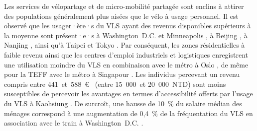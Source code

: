 \begin{refsegment}
Les services de vélopartage et de micro-mobilité partagée sont enclins à attirer des populations généralement plus aisées que le vélo à usage personnel. Il est observé que les usager·ère·s du \acrshort{VLS} ayant des revenus disponibles supérieurs à la moyenne sont présent·e·s à Washington~D.C. et Minneapolis \textcolor{blue}{\autocite[321]{martin_evaluating_2014}}, à Beijing \textcolor{blue}{\autocite[55]{zhao_bicycle-metro_2017}}, à Nanjing \textcolor{blue}{\autocite[7]{yang_empirical_2016}}, ainsi qu'à Taipei et Tokyo \textcolor{blue}{\autocite[216]{lin_built_2018}}. Par conséquent, les zones résidentielles à faible revenu ainsi que les centres d'emploi industriels et logistiques enregistrent une utilisation moindre du \acrshort{VLS} en combinaison avec le métro à Oslo \textcolor{blue}{\autocite[399]{bocker_bike_2020}}, de même pour la \acrshort{TEFF} avec le métro à Singapour \textcolor{blue}{\autocite[184]{cao_e-scooter_2021}}. Les individus percevant un revenu compris entre 441~et~588~\euro~ (entre 15~000~et 20~000~NTD) sont moins susceptibles de percevoir les avantages en termes d'accessibilité offerts par l'usage du \acrshort{VLS} à Kaohsiung \textcolor{blue}{\autocite[25]{cheng_expanding_2018}}. De surcroît, une hausse de 10~\% du salaire médian des ménages correspond à une augmentation de 0,4~\% de la fréquentation du \acrshort{VLS} en association avec le train à Washington~D.C. \textcolor{blue}{\autocite[8]{ma_bicycle_2015}}.%


\end{refsegment}
